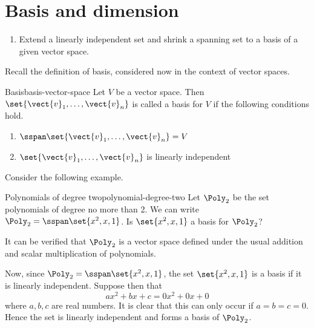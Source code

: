 \section{Basis and dimension}

\begin{outcome}
  \begin{enumerate}
  \item Extend a linearly independent set and shrink a spanning set to
    a basis of a given vector space.
  \end{enumerate}
\end{outcome}

Recall the definition of basis, considered now in the context of vector spaces.

\begin{definition}{Basis}{basis-vector-space}
  Let $V$ be a vector space. Then
  $\set{\vect{v}_{1},\ldots,\vect{v}_{n}}$ is called a
  basis for $V$ if the following conditions hold.
  \begin{enumerate}
  \item
    $\sspan\set{\vect{v}_{1},\ldots,\vect{v}_{n}} = V$
  \item
    $\set{\vect{v}_{1},\ldots,\vect{v}_{n}}$ is linearly independent
  \end{enumerate}
\end{definition}

Consider the following example.

\begin{example}{Polynomials of degree two}{polynomial-degree-two}
  Let $\Poly_2$ be the set polynomials of degree no more than 2. We
  can write $\Poly_2=\sspan\set{x^{2}, x, 1}$. Is $\set{x^{2}, x, 1} $
  a basis for $\Poly_2$?
\end{example}

\begin{solution}
  It can be verified that $\Poly_2$ is a vector space defined under
  the usual addition and scalar multiplication of polynomials.

  Now, since $\Poly_2=\sspan\set{x^{2},x, 1}$, the set
  $\set{x^{2}, x, 1} $ is a basis if it is linearly
  independent. Suppose then that
  \begin{equation*}
    ax^{2}+bx+c=0x^2 + 0x + 0
  \end{equation*}
  where $a,b,c$ are real numbers. It is clear that this can only occur
  if $a=b=c=0$. Hence the set is linearly independent and forms a
  basis of $\Poly_2$.
\end{solution}

